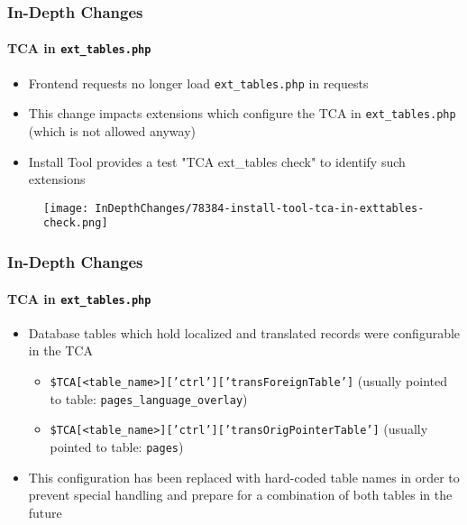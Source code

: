 \begin{frame}[fragile]
	\frametitle{In-Depth Changes}
	\framesubtitle{TCA in \texttt{ext\_tables.php}}

	\begin{itemize}
		\item Frontend requests no longer load \texttt{ext\_tables.php} in requests
		\item This change impacts extensions which configure the TCA in \texttt{ext\_tables.php}\newline
			\small(which is not allowed anyway)\normalsize
		\item Install Tool provides a test "TCA ext\_tables check" to identify such extensions
	\end{itemize}

	\begin{figure}
		\texttt{[image: InDepthChanges/78384-install-tool-tca-in-exttables-check.png]}
	\end{figure}

\end{frame}
\begin{frame}[fragile]
	\frametitle{In-Depth Changes}
	\framesubtitle{TCA in \texttt{ext\_tables.php}}

	\begin{itemize}
		\item Database tables which hold localized and translated records were configurable in the TCA

			\begin{itemize}
				\item \texttt{\$TCA[<table\_name>]['ctrl']['transForeignTable']}\newline
					(usually pointed to table: \texttt{pages\_language\_overlay})
				\item \texttt{\$TCA[<table\_name>]['ctrl']['transOrigPointerTable']}\newline
					(usually pointed to table: \texttt{pages})
			\end{itemize}

		\item This configuration has been replaced with hard-coded table names in order to prevent
			special handling and prepare for a combination of both tables in the future

	\end{itemize}

\end{frame}


